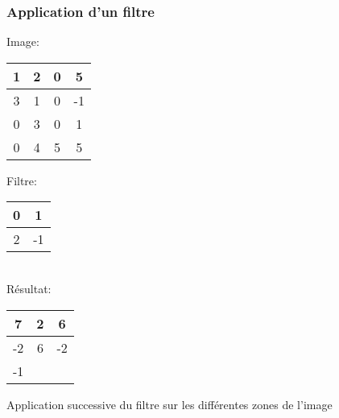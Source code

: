\documentclass{formation}
\begin{document}
\begin{frame}
  \frametitle{Application d'un filtre}
  \begin{multicols}{2}
    Image:
    \begin{tabular}{|c|c|c|c|}
      \hline
      1 & 2 & 0 & 5 \\
      \hline
      3 & 1 & 0 & -1 \\
      \hline
      \cellcolor{green}0 & \cellcolor{green}3 & 0 & 1 \\
      \hline
      \cellcolor{green}0 & \cellcolor{green}4 & 5 & 5 \\
      \hline
    \end{tabular}

    \columnbreak

    Filtre:
    \begin{tabular}{|c|c|}
      \hline
      0 & 1  \\
      \hline
      2 & -1 \\
      \hline
    \end{tabular}\\[.5cm]
    Résultat:
    \begin{tabular}{|c|c|c|}
      \hline
      7 & 2 & 6\\
      \hline
      -2 & 6 & -2\\
      \hline
      -1 &  & \\
      \hline
    \end{tabular}
  \end{multicols}
  Application successive du filtre sur les différentes zones de l'image
\end{frame}
\end{document}
